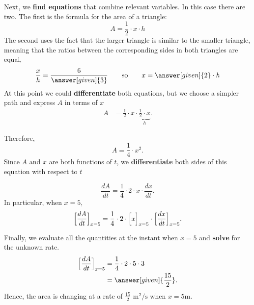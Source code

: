 \documentclass{ximera}
\begin{document}
\begin{example}
\begin{explanation}
    Next, we \textbf{find equations} that combine relevant
    variables. In this case there are two. The first is the formula
    for the area of a triangle:
    \[
    A = \frac{1}{2} \cdot x \cdot h
    \]
    The second uses the fact that the larger triangle is similar to
    the smaller triangle, meaning that the ratios between the corresponding sides in both triangles
    are equal,
    \[
    \frac{x}{h} = \frac{6}{\answer[given]{3}}\qquad\text{so}\qquad x =
    \answer[given]{2}\cdot h
    \]
   At this point we could \textbf{differentiate} both equations, but we 
    choose a simpler path and express  $A$ in terms of $x$  
     \begin{align*}
    A& = \frac{1}{2} \cdot x\cdot\underbrace{ \frac{1}{2}\cdot x}_{h} .
     \end{align*}
     
     Therefore,
     \[
     A=\frac{1}{4}\cdot x^2.
     \]
       Since $A$ and $x$ are both functions of $t$, we \textbf{differentiate} both sides of this equation with respect to $t$
       
        \[
     \frac{dA}{dt}=\frac{1}{4}\cdot2\cdot x\cdot\frac{dx}{dt}.
     \]
In particular, when $x=5$, 
      \[
     \Bigl[ \frac{dA}{dt}\Bigr]_{x=5}=\frac{1}{4}\cdot2\cdot \Bigl[ x\Bigr]_{x=5}\cdot \Bigl[\frac{dx}{dt}\Bigr]_{x=5}.
     \]
     
     Finally, we evaluate all the quantities at the instant when $x=5$ and  
      \textbf{solve} for the unknown rate.
    \begin{align*}
    \Bigl[\dfrac{dA}{dt}\Bigr]_{x=5}  &=\frac{1}{4}\cdot2\cdot5\cdot3\\
      &= \answer[given]{ \frac{15}{2}}.
    \end{align*}
    Hence, the area is changing at a rate of $ \frac{15}{2}$ $\text{m}^2/\text{s}$ when $x=5$m.
    
  \end{explanation}
\end{example}
\end{document}
